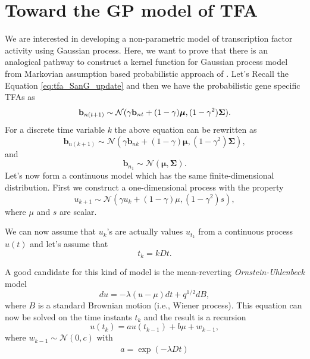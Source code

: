 \section{Toward the GP model of TFA}\label{Sec:Toward_TFA}
We are interested in developing a non-parametric model of transcription factor activity using Gaussian process. Here, we want to prove that there is an analogical pathway to construct a kernel function for Gaussian process model from Markovian assumption based probabilistic approach of \cite{Sanguinetti:2006}. Let's Recall the Equation \ref{eq:tfa_SanG_update}  and then we have the probabilistic gene specific TFAs as
\begin{equation*} \label{eq:tfa_SanG_updateCh4}
\bold{b}_{n(t+1)} \sim \mathcal{N} (\gamma \bold{b}_{nt} + (1-\gamma)\boldsymbol{\mu},(1-\gamma^2)\bold{\Sigma}).
\end{equation*}
For a discrete time variable $k$ the above equation can be rewritten as
\begin{equation}
\textbf{b}_{n(k+1)} \sim \mathcal{N}\left(\gamma \textbf{b}_{nk} + (1 - \gamma) \boldsymbol{\mu}, (1 - \gamma^2) \boldsymbol{\Sigma}\right),
\end{equation}
and
\begin{equation}
\textbf{b}_{n_1} \sim \mathcal{N}\left(\boldsymbol{\mu}, \boldsymbol{\Sigma}\right).
\end{equation}
Let's now form a continuous model which has the same finite-dimensional distribution. First we construct a one-dimensional process with the property
\begin{equation}
u_{k+1} \sim \mathcal{N}\left(\gamma u_k + \left(1 - \gamma\right) \mu, (1 - \gamma^2)s \right),
\end{equation}
where $\mu$ and $s$ are scalar.

We can now assume that $u_k$'s are actually values $u_{t_k}$ from a continuous process $u(t)$ and let's assume that 
\begin{equation}
t_k = kDt.
\end{equation}

A good candidate for this kind of model is the mean-reverting \emph{Ornstein-Uhlenbeck} model \cite{Ornstein_Uhlenbeck:1930}
\begin{equation}\label{eq:OUP}
du = -\lambda \left(u - \mu\right) dt + q^{1/2} dB,
\end{equation}
where $B$ is a standard Brownian motion (i.e., Wiener process). This equation can now be solved on the time instants $t_k$ and the result is a recursion
\begin{equation}
u(t_k) = a u(t_{k-1}) + b \mu + w_{k-1},
\end{equation}
where $w_{k-1} \sim \mathcal{N}(0,c)$ with
\begin{equation*} \label{eq:a}
\begin{split}
a = \exp(-\lambda Dt)
\end{split}
\end{equation*}

